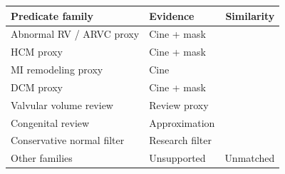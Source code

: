 \label{tab:predicate_evidence_alignment}
\begin{tabularx}{\linewidth}{@{}Y>{\raggedright\arraybackslash}p{26mm}r@{}}
\toprule
\textbf{Predicate family} & \textbf{Evidence} & \textbf{Similarity}\\
\midrule
Abnormal RV / ARVC proxy & Cine + mask & \\
HCM proxy & Cine + mask & \\
MI remodeling proxy & Cine & \\
DCM proxy & Cine + mask & \\
Valvular volume review & Review proxy & \\
Congenital review & Approximation & \\
Conservative normal filter & Research filter & \\
Other families & Unsupported & \textcolor{dexpiRedDark}{Unmatched}\\
\bottomrule
\end{tabularx}
